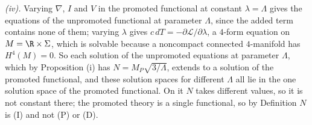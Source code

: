 \emph{(iv).} Varying $\nabla$, $I$ and $V$ in the promoted functional at constant $\lambda = \Lambda$ gives the equations of the unpromoted functional at parameter $\Lambda$, since the added term contains none of them; varying $\lambda$ gives $c\,dT = -\partial\mathcal{L}/\partial\lambda$, a $4$-form equation on $M = \R \times \Sigma$, which is solvable because a noncompact connected $4$-manifold has $H^{4}(M) = 0$. So each solution of the unpromoted equations at parameter $\Lambda$, which by Proposition (i) has $N = M_{P}\sqrt{3/\Lambda}$, extends to a solution of the promoted functional, and these solution spaces for different $\Lambda$ all lie in the one solution space of the promoted functional. On it $N$ takes different values, so it is not constant there; the promoted theory is a single functional, so by Definition  $N$ is (I) and not (P) or (D).
